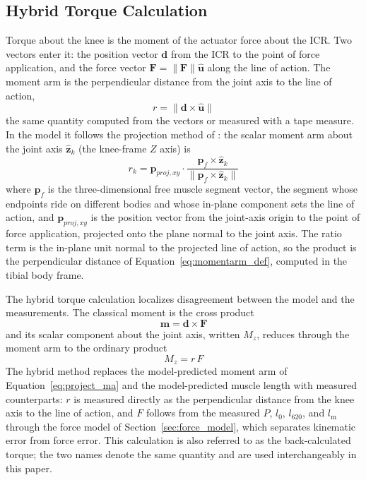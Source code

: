 \documentclass[utf8]{FrontiersinHarvard} %
\providecommand{\norm}[1]{\lVert#1\rVert}
\begin{document}
\subsection{Hybrid Torque Calculation}\label{sec:hybrid_method}

Torque about the knee is the moment of the actuator force about the ICR. Two vectors enter it: the position vector $\mathbf{d}$ from the ICR to the point of force application, and the force vector $\mathbf{F} = \norm{\mathbf{F}}\hat{\mathbf{u}}$ along the line of action. The moment arm is the perpendicular distance from the joint axis to the line of action,
\begin{equation}
    r = \norm{\mathbf{d} \times \hat{\mathbf{u}}}
    \label{eq:momentarm_def}
\end{equation}
the same quantity computed from the vectors or measured with a tape measure. In the model it follows the projection method of \citet{young_analyzing_2019}: the scalar moment arm about the joint axis $\hat{\mathbf{z}}_{k}$ (the knee-frame $Z$ axis) is
\begin{equation}
    r_{k} = \mathbf{p}_{proj,xy} \cdot \frac{\mathbf{p}_{f} \times \hat{\mathbf{z}}_{k}} {\norm{\mathbf{p}_{f} \times \hat{\mathbf{z}}_{k}}} \label{eq:project_ma}
\end{equation}
where $\mathbf{p}_{f}$ is the three-dimensional free muscle segment vector, the segment whose endpoints ride on different bodies and whose in-plane component sets the line of action, and $\mathbf{p}_{proj,xy}$ is the position vector from the joint-axis origin to the point of force application, projected onto the plane normal to the joint axis. The ratio term is the in-plane unit normal to the projected line of action, so the product is the perpendicular distance of Equation~\eqref{eq:momentarm_def}, computed in the tibial body frame.

The hybrid torque calculation localizes disagreement between the model and the measurements. The classical moment is the cross product
\begin{equation}
    \mathbf{m} = \mathbf{d} \times \mathbf{F} \label{eq:M_vec}
\end{equation}
and its scalar component about the joint axis, written $M_{z}$, reduces through the moment arm to the ordinary product
\begin{equation}
    M_{z} = r\,F \label{eq:M_scalar}
\end{equation}
The hybrid method replaces the model-predicted moment arm of Equation~\eqref{eq:project_ma} and the model-predicted muscle length with measured counterparts: $r$ is measured directly as the perpendicular distance from the knee axis to the line of action, and $F$ follows from the measured $P$, $l_{0}$, $l_{620}$, and $l_\text{m}$ through the force model of Section~\ref{sec:force_model}, which separates kinematic error from force error. This calculation is also referred to as the back-calculated torque; the two names denote the same quantity and are used interchangeably in this paper.
\end{document}

